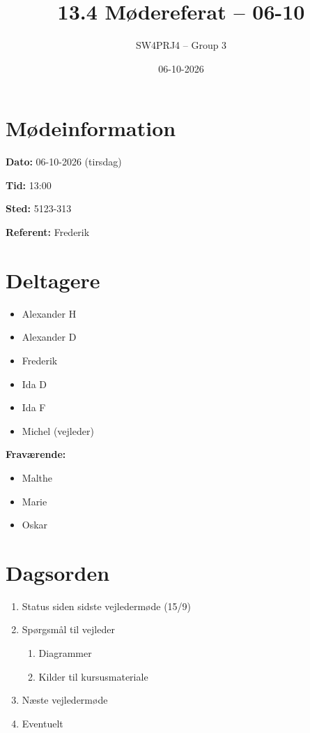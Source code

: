 \documentclass[a4paper,11pt]{article}
\title{13.4 Mødereferat -- 06-10}
\author{SW4PRJ4 -- Group 3}
\date{06-10-2026}
\begin{document}
\maketitle

\section*{Mødeinformation}

\textbf{Dato:} 06-10-2026 (tirsdag)

\textbf{Tid:} 13:00

\textbf{Sted:} 5123-313

\textbf{Referent:} Frederik

\section*{Deltagere}

\begin{itemize}
    \item Alexander H
    \item Alexander D
    \item Frederik
    \item Ida D
    \item Ida F
    \item Michel (vejleder)
\end{itemize}

\textbf{Fraværende:}

\begin{itemize}
    \item Malthe
    \item Marie
    \item Oskar
\end{itemize}

\section*{Dagsorden}

\begin{enumerate}
    \item Status siden sidste vejledermøde (15/9)
    \item Spørgsmål til vejleder
    \begin{enumerate}
        \item Diagrammer
        \item Kilder til kursusmateriale
    \end{enumerate}
    \item Næste vejledermøde
    \item Eventuelt
\end{enumerate}
\end{document}
